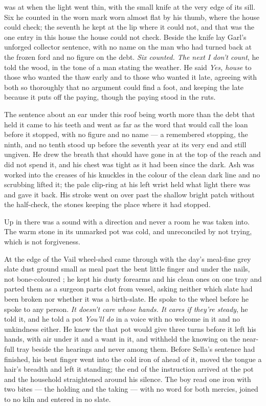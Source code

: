  was at  when the light went thin, with the small knife at the very edge of its sill. Six he counted in the worn mark worn almost flat by his thumb, where the house could check; the seventh he kept at the lip where it could not, and that was the one entry in this house the house could not check. Beside the knife lay Garl's unforged collector sentence, with no name on the man who had turned back at the frozen ford and no figure on the debt. \emph{Six counted. The next I don't count}, he told the wood, in the tone of a man stating the weather. He said \emph{Yes, house} to those who wanted the thaw early and to those who wanted it late, agreeing with both so thoroughly that no argument could find a foot, and keeping the late because it puts off the paying, though the paying stood in the ruts.

The sentence about an ear under this roof being worth more than the debt that held it came to his teeth and went as far as the word that would call the loan before it stopped, with no figure and no name --- a remembered stopping, the ninth, and no tenth stood up before the seventh year at its very end and still ungiven. He drew the breath that should have gone in at the top of the reach and did not spend it, and his chest was tight as it had been since the dark. Ash was worked into the creases of his knuckles in the colour of the clean dark line and no scrubbing lifted it; the pale clip-ring at his left wrist held what light there was and gave it back. His stroke went on over  past the shallow bright patch without the half-check, the stones keeping the place where it had stopped.

Up in  there was a sound with a direction and never a room he was taken into. The warm stone in its unmarked pot was cold, and unreconciled by not trying, which is not forgiveness.

At the edge of the Vail wheel-shed  came through with the day's meal-fine grey slate dust ground small as meal past the bent little finger and under the nails, not bone-coloured ; he kept his dusty forearms and his clean ones on one tray and parted them as a surgeon parts clot from vessel, asking neither which slate had been broken nor whether it was a birth-slate. He spoke to the wheel before he spoke to any person. \emph{It doesn't care whose hands. It cares if they're steady}, he told it, and he told a pot \emph{You'll do} in a voice with no welcome in it and no unkindness either. He knew the  that pot would give three turns before it left his hands, with air under it and a want in it, and withheld the knowing on the near-full tray beside the hearings and never among them. Before Sella's sentence had finished, his bent finger went into the cold iron of  ahead of it, moved the tongue a hair's breadth and left it standing; the end of the instruction arrived at the pot and the household straightened around his silence. The boy read one iron with two bites --- the holding and the taking --- with no  word for both mercies, joined to no kiln and entered in no slate.

